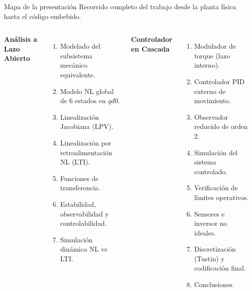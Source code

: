\documentclass[aspectratio=169,t]{beamer}
\begin{document}
\begin{frame}{Mapa de la presentación}
  {\small\color{uncGray}Recorrido completo del trabajo desde la planta física hasta el código embebido.}\par
  \vspace{3mm}

  \begin{columns}[T]
    \textbf{Análisis a Lazo Abierto}
    \begin{enumerate}\small
      \item Modelado del subsistema mecánico equivalente.
      \item Modelo NL global de 6 estados en $qd0$.
      \item Linealización Jacobiana (LPV).
      \item Linealización por retroalimentación NL (LTI).
      \item Funciones de transferencia.
      \item Estabilidad, observabilidad y controlabilidad.
      \item Simulación dinámica NL vs LTI.
    \end{enumerate}

    \textbf{Controlador en Cascada}
    \begin{enumerate}\small\setcounter{enumi}{7}
      \item Modulador de torque (lazo interno).
      \item Controlador PID externo de movimiento.
      \item Observador reducido de orden 2.
      \item Simulación del sistema controlado.
      \item Verificación de límites operativos.
      \item Sensores e inversor no ideales.
      \item Discretización (Tustin) y codificación final.
      \item Conclusiones.
    \end{enumerate}
  \end{columns}
\end{frame}

\end{document}

